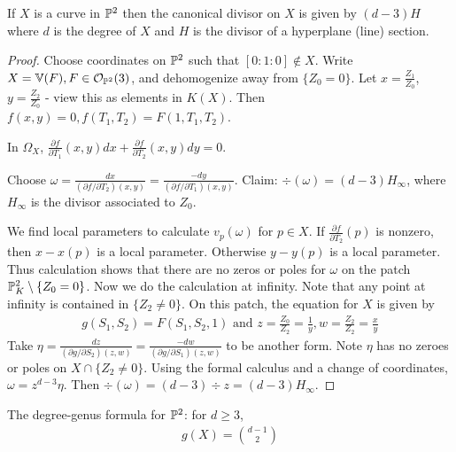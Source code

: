 \documentclass[10pt,a4paper,rgb]{article}
\begin{document}
\begin{proposition}
If $X$ is a curve in $\P^2$ then the canonical divisor on $X$ is given by $(d-3)H$ where $d$ is the degree of $X$ and $H$ is the divisor of a hyperplane (line) section.
\end{proposition}
\begin{proof}
Choose coordinates on $\P^2$ such that $[0:1:0] \notin X$. Write $X = \V(F), F \in \mathcal{O}_{\P^2}(3)$, and dehomogenize away from $\{Z_0 = 0\}$. Let $x = \frac{Z_1}{Z_0}$, $y = \frac{Z_2}{Z_0}$ - view this as elements in $K(X)$. Then $f(x,y) = 0, f(T_1,T_2) = F(1,T_1,T_2)$. 

In $\Omega_X$, $\frac{\partial f}{\partial T_1}(x,y) dx + \frac{\partial f}{\partial T_2}(x,y) dy = 0$.

Choose $\omega = \frac{dx}{(\partial f / \partial T_2)(x,y)} = \frac{-dy}{(\partial f/\partial T_1)(x,y)}$. Claim: $\div(\omega) = (d-3)H_{\infty}$, where $H_\infty$ is the divisor associated to $Z_0$. 

We find local parameters to calculate $v_p(\omega)$ for $p \in X$. If $\frac{\partial f}{\partial T_2}(p)$ is nonzero, then $x-x(p)$ is a local parameter. Otherwise $y-y(p)$ is a local parameter. Thus calculation shows that there are no zeros or poles for $\omega$ on the patch $\P_K^2\setminus \{Z_0=0\}$. Now we do the calculation at infinity. Note that any point at infinity is contained in $\{Z_2 \neq 0 \}$. On this patch, the equation for $X$ is given by
\begin{align*}
g(S_1, S_2) = F(S_1, S_2, 1) \text{ and } z = \frac{Z_0}{Z_2}=\frac{1}{y}, w = \frac{Z_2}{Z_2} = \frac{x}{y}
\end{align*}
Take $\eta = \frac{dz}{(\partial g/\partial S_2)(z,w)} = \frac{-dw}{(\partial g/\partial S_1)(z,w)}$ to be another form. Note $\eta$ has no zeroes or poles on $X \cap \{Z_2 \neq 0\}$. Using the formal calculus and a change of coordinates, $\omega = z^{d-3} \eta$. Then $\div(\omega) = (d-3)\div z = (d-3) H_\infty$.
\end{proof}
\begin{corollary}
The degree-genus formula for $\P^2$: for $d \geq 3$,
\begin{align*}
g(X) = \binom{d-1}{2}
\end{align*}
\end{corollary}
\end{document}

